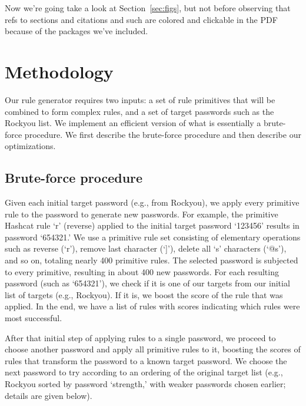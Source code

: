 \documentclass[letterpaper,twocolumn,10pt]{article}
\begin{document}
Now we're going take a look at Section~\ref{sec:figs}, but not before
observing that refs to sections and citations and such are colored and
clickable in the PDF because of the packages we've included.

\section{Methodology}
\label{sec:methodology}

Our rule generator requires two inputs: a set of rule primitives that will be combined to form complex rules, and a set of target passwords such as the Rockyou list. We implement an efficient version of what is essentially a brute-force procedure. We first describe the brute-force procedure and then describe our optimizations.

\subsection{Brute-force procedure}

Given each initial target password (e.g., from Rockyou), we apply every primitive rule to the password to generate new passwords. For example, the primitive Hashcat rule `r' (reverse) applied to the initial target password `123456' results in password `654321.' We use a primitive rule set consisting of elementary operations such as reverse (`r'), remove last character (`]'), delete all `s' characters (`@s'), and so on, totaling nearly 400 primitive rules. The selected password is subjected to every primitive, resulting in about 400 new passwords. For each resulting password (such as `654321'), we check if it is one of our targets from our initial list of targets (e.g., Rockyou). If it is, we boost the score of the rule that was applied. In the end, we have a list of rules with scores indicating which rules were most successful.

After that initial step of applying rules to a single password, we proceed to choose another password and apply all primitive rules to it, boosting the scores of rules that transform the password to a known target password. We choose the next password to try according to an ordering of the original target list (e.g., Rockyou sorted by password `strength,' with weaker passwords chosen earlier; details are given below).
\end{document}

